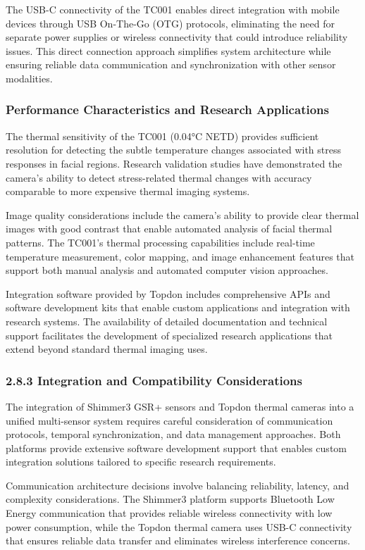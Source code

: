 \documentclass[12pt,a4paper]{article}
\begin{document}
The USB-C connectivity of the TC001 enables direct integration with mobile devices through USB On-The-Go (OTG)
protocols, eliminating the need for separate power supplies or wireless connectivity that could introduce reliability
issues. This direct connection approach simplifies system architecture while ensuring reliable data communication and
synchronization with other sensor modalities.

\subsubsection{Performance Characteristics and Research Applications}

The thermal sensitivity of the TC001 (0.04°C NETD) provides sufficient resolution for detecting the subtle temperature
changes associated with stress responses in facial regions. Research validation studies have demonstrated the camera's
ability to detect stress-related thermal changes with accuracy comparable to more expensive thermal imaging systems.

Image quality considerations include the camera's ability to provide clear thermal images with good contrast that enable
automated analysis of facial thermal patterns. The TC001's thermal processing capabilities include real-time temperature
measurement, color mapping, and image enhancement features that support both manual analysis and automated computer
vision approaches.

Integration software provided by Topdon includes comprehensive APIs and software development kits that enable custom
applications and integration with research systems. The availability of detailed documentation and technical support
facilitates the development of specialized research applications that extend beyond standard thermal imaging uses.

\subsubsection{2.8.3 Integration and Compatibility Considerations}

The integration of Shimmer3 GSR+ sensors and Topdon thermal cameras into a unified multi-sensor system requires careful
consideration of communication protocols, temporal synchronization, and data management approaches. Both platforms
provide extensive software development support that enables custom integration solutions tailored to specific research
requirements.

Communication architecture decisions involve balancing reliability, latency, and complexity considerations. The Shimmer3
platform supports Bluetooth Low Energy communication that provides reliable wireless connectivity with low power
consumption, while the Topdon thermal camera uses USB-C connectivity that ensures reliable data transfer and eliminates
wireless interference concerns.
\end{document}
